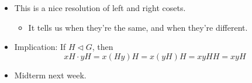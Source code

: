 \documentclass[../notes.tex]{subfiles}
\begin{document}
\begin{itemize}
\begin{proof}
    \end{proof}
    \item This is a nice resolution of left and right cosets.
    \begin{itemize}
        \item It tells us when they're the same, and when they're different.
    \end{itemize}
    \item Implication: If $H\triangleleft G$, then
    \begin{equation*}
        xH\cdot yH = x(Hy)H
        = x(yH)H
        = xyHH
        = xyH
    \end{equation*}
    \item Midterm next week.
\end{itemize}
\end{document}
